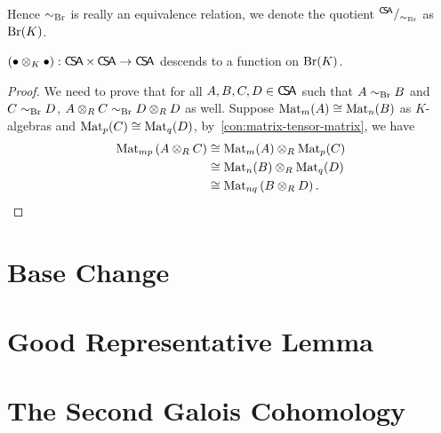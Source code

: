 Hence $\sim_{\operatorname{Br}}$ is really an equivalence relation, we denote the quotient ${}^{\operatorname{\mathsf{C}\!\mathsf{S}\!\mathsf{A}}}/_{\sim_{\operatorname{Br}}}$ as $\operatorname{Br}(K)$.

\begin{lemma}\label{lem:br-mul-wd}
  $(\bullet\otimes_{K}\bullet):\operatorname{\mathsf{C}\!\mathsf{S}\!\mathsf{A}}\times\operatorname{\mathsf{C}\!\mathsf{S}\!\mathsf{A}} \to \operatorname{\mathsf{C}\!\mathsf{S}\!\mathsf{A}}$ descends to a function on $\operatorname{Br}(K)$.
  \leanok
\end{lemma}
\begin{proof}
  We need to prove that for all $A, B, C, D \in \operatorname{\mathsf{C}\!\mathsf{S}\!\mathsf{A}}$ such that $A\sim_{\operatorname{Br}} B$ and $C\sim_{\operatorname{Br}}D$, $A\otimes_{R}C \sim_{\operatorname{Br}} D\otimes_{R}D$ as well.
  Suppose $\operatorname{Mat}_{m}(A)\cong \operatorname{Mat}_{n}(B)$ as $K$-algebras and $\operatorname{Mat}_{p}(C)\cong\operatorname{Mat}_{q}(D)$, by~\cref{con:matrix-tensor-matrix}, we have
  \[
    \begin{aligned}
      \operatorname{Mat}_{mp}\left(A\otimes_{R} C\right)&\cong \operatorname{Mat}_{m}(A)\otimes_{R}\operatorname{Mat}_{p}(C) \\
                                          &\cong \operatorname{Mat}_{n}(B)\otimes_{R}\operatorname{Mat}_{q}(D)\\
      &\cong \operatorname{Mat}_{nq}\left(B\otimes_{R}D\right).
    \end{aligned}
  \]

\end{proof}

\section{Base Change}

\section{Good Representative Lemma}

\section{The Second Galois Cohomology}

